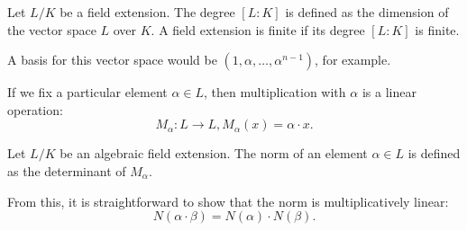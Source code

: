 \begin{definition}
  Let $L/K$ be a field extension.
  The degree $[L : K]$ is defined as the dimension of the vector space $L$ over $K$.
  A field extension is finite if its degree $[L : K]$ is finite.
\end{definition}

A basis for this vector space would be $(1, α, …, α^{n-1})$, for example.

If we fix a particular element $α ∈ L$, then multiplication with $α$ is a linear operation:
\[
  M_α : L → L, M_α(x) = α · x.
\]

\begin{definition}
  Let $L/K$ be an algebraic field extension.
  The norm of an element $α ∈ L$ is defined as the determinant of $M_α$.
\end{definition}

From this, it is straightforward to show that the norm is multiplicatively linear:
\[
  N(α · β) = N(α) · N(β).
\]

